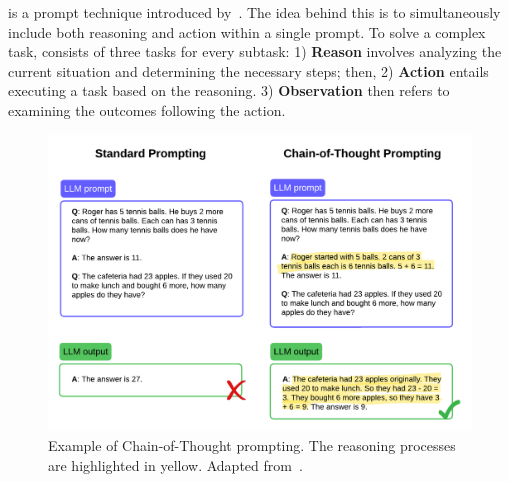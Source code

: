 {\react} is a prompt technique introduced by~\citet{yao_react_2023}. The idea behind this is to simultaneously include both reasoning and action within a single prompt. To solve a complex task, {\react} consists of three tasks for every subtask: 1) \textbf{Reason} involves analyzing the current situation and determining the necessary steps; then, 2) \textbf{Action} entails executing a task based on the reasoning. 3) \textbf{Observation} then refers to examining the outcomes following the action.

\begin{figure}[H]
    \includegraphics[width=\textwidth]{figs/chapter2/CoT.png}
    \centering
    \caption[Example of Chain-of-Thought prompting]{Example of Chain-of-Thought prompting. The reasoning processes are highlighted in yellow. Adapted from~\citet{wei_chain--thought_2023}.}
    \label{fig_cot}
\end{figure}




